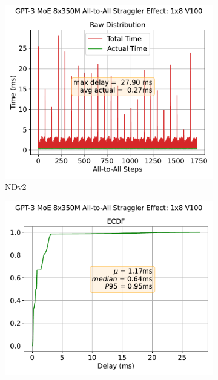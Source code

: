 \begin{figure}[!ht]
    \begin{subfigure}{.5\linewidth}
        \centering
        \includegraphics[width=\linewidth, keepaspectratio]{images/GPT-3_MoE_8x350M}
        \caption{NDv2}
        \label{sub:s_350}
    \end{subfigure}%
    \begin{subfigure}{.5\linewidth}
        \centering
        \includegraphics[width=\linewidth, keepaspectratio]{images/GPT-3_MoE_8x350M_ecdf}

\end{subfigure}
\end{figure}
